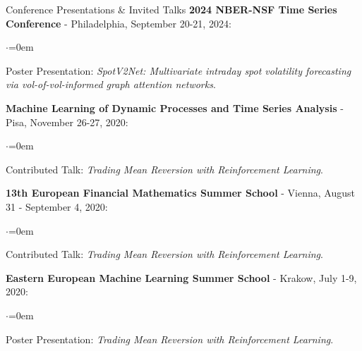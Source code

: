 \documentclass{resume} %
\begin{document}
\begin{rSection}{Conference Presentations \& Invited Talks}
\textbf{2024 NBER-NSF Time Series Conference} - Philadelphia, September 20-21, 2024:
\begin{list}{$\cdot$}{\leftmargin=0em}
\item Poster Presentation: \emph{SpotV2Net: Multivariate intraday spot volatility forecasting via vol-of-vol-informed graph attention networks}.
\end{list}

\textbf{Machine Learning of Dynamic Processes and Time Series Analysis} - Pisa, November 26-27, 2020:
\begin{list}{$\cdot$}{\leftmargin=0em}
\item Contributed Talk: \emph{Trading Mean Reversion with Reinforcement Learning}.
\end{list}

\textbf{13th European Financial Mathematics Summer School} - Vienna, August 31 - September 4, 2020:
\begin{list}{$\cdot$}{\leftmargin=0em}
\item Contributed Talk: \emph{Trading Mean Reversion with Reinforcement Learning}.
\end{list}

\textbf{Eastern European Machine Learning Summer School} - Krakow, July 1-9, 2020:
\begin{list}{$\cdot$}{\leftmargin=0em}
\item Poster Presentation: \emph{Trading Mean Reversion with Reinforcement Learning}.
\end{list}

\end{rSection}
\end{document}
